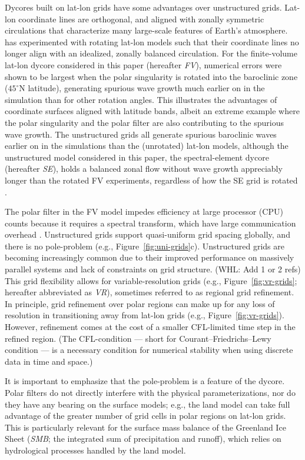 \documentclass[draft]{agujournal2019}
\begin{document}
Dycores built on lat-lon grids have some advantages over unstructured grids. Lat-lon coordinate lines are orthogonal, and aligned with zonally symmetric circulations that characterize many large-scale features of Earth's atmosphere.  has experimented with rotating lat-lon models such that their coordinate lines no longer align with an idealized, zonally balanced circulation. For the finite-volume lat-lon dycore considered in this paper (hereafter \textit{FV}), numerical errors were shown to be largest when the polar singularity is rotated into the baroclinic zone ($45^{\circ}$N latitude), generating spurious wave growth much earlier on in the simulation than for other rotation angles. This illustrates the advantages of coordinate surfaces aligned with latitude bands, albeit an extreme example where the polar singularity and the polar filter are also contributing to the spurious wave growth. The unstructured grids all generate spurious baroclinic waves earlier on in the simulations than the (unrotated) lat-lon models, although the unstructured model considered in this paper, the spectral-element dycore (hereafter \textit{SE}), holds a balanced zonal flow without wave growth appreciably longer than the rotated FV experiments, regardless of how the SE grid is rotated \cite{LJTN2010JAMES}.

The polar filter in the FV model impedes efficiency at large processor (CPU) counts because it requires a spectral transform, which have large communication overhead \cite{ST1995GEOS,DetAl2012IJHPCA}. Unstructured grids support quasi-uniform grid spacing globally, and there is no pole-problem (e.g., Figure~\ref{fig:uni-grids}c). Unstructured grids are becoming increasingly common due to their improved performance on massively parallel systems and lack of constraints on grid structure. {\color{blue} (WHL: Add 1 or 2 refs)} This grid flexibility allows for variable-resolution grids (e.g., Figure~\ref{fig:vr-grids}; hereafter abbreviated as \textit{VR}), sometimes referred to as regional grid refinement. In principle, grid refinement over polar regions can make up for any loss of resolution in transitioning away from lat-lon grids (e.g., Figure~\ref{fig:vr-grids}).  However, refinement comes at the cost of a smaller CFL-limited time step in the refined region. (The CFL-condition --- short for Courant–Friedrichs–Lewy condition --- is a necessary condition for numerical stability when using discrete data in time and space.)

It is important to emphasize that the pole-problem is a feature of the dycore. Polar filters do not directly interfere with the physical parameterizations, nor do they have any bearing on the surface models; e.g., the land model can take full advantage of the greater number of grid cells in polar regions on lat-lon grids. This is particularly relevant for the surface mass balance of the Greenland Ice Sheet (\textit{SMB}; the integrated sum of precipitation and runoff), which relies on hydrological processes handled by the land model.
\end{document}
